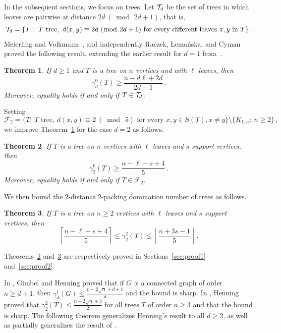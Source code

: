\documentclass[12pt]{article}
\newtheorem{theorem}{Theorem}[section]
\newcommand{\mrho}{\gamma_2^2}
\newcommand{\F}{\mathcal{F}}
\begin{document}
In the subsequent sections, we focus on trees. Let ${\cal T}_d$ be the set of trees in which leaves are pairwise at distance $2d\ (\bmod\ {2d+1})$, that is, 
$${\cal T}_d = \{ T:\ T \text{ tree},\ d(x,y) \equiv 2d\ (\bmod\ {2d+1}) \text{ for every different leaves } x, y \text{ in } T\}\,.$$
Meierling and Volkmann~\cite{Meierling-2005}, and independently Raczek, Lema\'nska, and Cyman~\cite{Raczek-2006} proved the following result, extending the earlier result for $d = 1$ from~\cite{Lemanska-2004}.

\begin{theorem} {\rm \cite{Meierling-2005, Raczek-2006}}
\label{thm:k-distance-in-trees}
If $d\ge 1$ and $T$ is a tree on $n$ vertices and with $\ell$ leaves, then 
$$\gamma_d^0(T) \geq \frac{n - d \ell + 2d}{2d+1}\,.$$
Moreover, equality holds if and only if $T\in {\cal T}_d$.
\end{theorem}
Setting 
$$\F_2 = \{ T:\ T \text{ tree},\ d(x,y) \equiv 2\ (\bmod\ {5}) \text{ for every } x, y \in S(T), x\ne y\} \setminus \{K_{1,n}:\ n \geq 2\}\,,$$
we improve Theorem~\ref{thm:k-distance-in-trees} for the case $d=2$ as follows. 

\begin{theorem}
    \label{thm:lower-bound-trees-2-domination}
    If $T$ is a tree on $n$ vertices with $\ell$ leaves and $s$ support vertices, then $$\gamma_2^0(T) \geq \frac{n-\ell-s+4}{5}\,.$$ 
    Moreover, equality holds if and only if $T\in \F_2$.
\end{theorem}

We then bound the $2$-distance $2$-packing domination number of trees as follows.

\begin{theorem}
    \label{thm:2-2-lower-upper}
    If $T$ is a tree on $n \ge 2$ vertices with $\ell$ leaves and $s$ support vertices, then 
    $$\left \lceil \frac{n-\ell-s+4}{5} \right \rceil \leq \mrho(T) \leq \left \lfloor \frac{n+3s-1}{5} \right \rfloor\,.$$
\end{theorem}

Theorems~\ref{thm:lower-bound-trees-2-domination} and~\ref{thm:2-2-lower-upper} are respectively proved in Sections~\ref{sec:proof1} and~\ref{sec:proof2}. 

In \cite{Gimbel-1996}, Gimbel and Henning proved that if $G$ is a connected graph of order $n \geq d+1$, then $\gamma_d^1(G) \leq \frac{n-2\sqrt{n}+d+1}{d}$ and the bound is sharp. In \cite{Henning-1998-1}, Henning proved that $\mrho(T) \leq \frac{n-2\sqrt{n}+3}{2}$ for all trees $T$ of order $n \geq 3$ and that the bound is sharp. The following theorem generalizes Henning's result to all $d \geq 2$, as well as partially generalizes the result of \cite{Gimbel-1996}.
\end{document}
